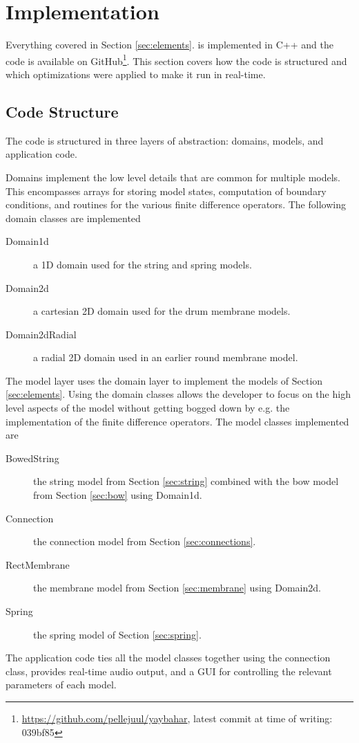 \documentclass{article}
\begin{document}
\section{Implementation}
\label{sec:implementation}

Everything covered in Section \ref{sec:elements}. is implemented in C++ and the code is available on GitHub\footnote{\url{https://github.com/pellejuul/yaybahar}, latest commit at time of writing: 039bf85}.
This section covers how the code is structured and which optimizations were applied to make it run in real-time.

\subsection{Code Structure}

The code is structured in three layers of abstraction: domains, models, and application code.

Domains implement the low level details that are common for multiple models.
This encompasses arrays for storing model states, computation of boundary conditions, and routines for the various finite difference operators.
The following domain classes are implemented
\begin{description}
  \item[Domain1d] a 1D domain used for the string and spring models.
  \item[Domain2d] a cartesian 2D domain used for the drum membrane models. 
  \item[Domain2dRadial] a radial 2D domain used in an earlier round membrane model.
\end{description}
%
The model layer uses the domain layer to implement the models of Section \ref{sec:elements}.
Using the domain classes allows the developer to focus on the high level aspects of the model without getting bogged down by e.g. the implementation of the finite difference operators.
The model classes implemented are
\begin{description}
  \item[BowedString] the string model from Section \ref{sec:string} combined with the bow model from Section \ref{sec:bow} using Domain1d.
  \item[Connection] the connection model from Section \ref{sec:connections}.
  \item[RectMembrane] the membrane model from Section \ref{sec:membrane} using Domain2d.
  \item[Spring] the spring model of Section \ref{sec:spring}.
\end{description}
%
The application code ties all the model classes together using the connection class, provides real-time audio output, and a GUI for controlling the relevant parameters of each model.
\end{document}
